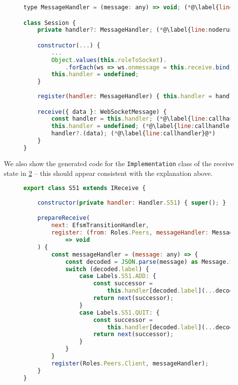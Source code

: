 \begin{figure}[!h]
\begin{lstlisting}[language=javascript,tabsize=2]
type MessageHandler = (message: any) => void; (*@\label{line:msghandler}@*)

class Session {
	private handler?: MessageHandler; (*@\label{line:noderuntimehandler}@*)

	constructor(...) {
		...
		Object.values(this.roleToSocket).
			.forEach(ws => ws.onmessage = this.receive.bind(this)); (*@\label{line:wsbind}@*)
		this.handler = undefined;
	}
	
	register(handler: MessageHandler) { this.handler = handler; } (*@\label{line:register}@*)

	receive({ data }: WebSocketMessage) {
		const handler = this.handler; (*@\label{line:callhandlerstart}@*)
		this.handler = undefined; (*@\label{line:callhandler2}@*)
		handler?.(data); (*@\label{line:callhandler}@*)
	}
}
\end{lstlisting}
\label{lst:noderuntimewsmsg}
\end{figure}

We also show the generated code for the \texttt{Implementation}
class of the receive state in \cref{lst:nodereceive}
-- this should appear consistent
with the explanation above.

\begin{figure}[!h]
\begin{lstlisting}[language=javascript,tabsize=2]
export class S51 extends IReceive {
	
	constructor(private handler: Handler.S51) { super(); }

	prepareReceive(
		next: EfsmTransitionHandler,
		register: (from: Roles.Peers, messageHandler: MessageHandler)
			=> void
	) {
		const messageHandler = (message: any) => {
			const decoded = JSON.parse(message) as Message.S51;
			switch (decoded.label) {
				case Labels.S51.ADD: {
					const successor = 
						this.handler[decoded.label](...decoded.payload);
					return next(successor);
				}
				case Labels.S51.QUIT: {
					const successor = 
						this.handler[decoded.label](...decoded.payload);
					return next(successor);	
				}
			}            
		}
		register(Roles.Peers.Client, messageHandler);
	}
}
\end{lstlisting}
\label{lst:nodereceive}
\end{figure}

